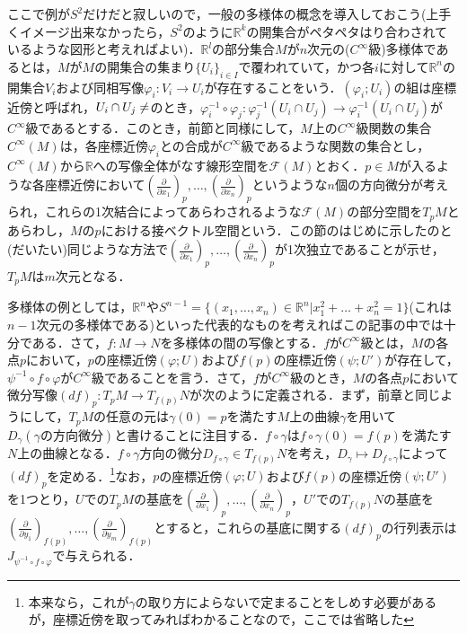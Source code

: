 \documentclass{jsarticle}
\def\realnum{{\mathbb R}}
\def\dfrac{\displaystyle\frac}
\def\delxop{\left(\dfrac{\partial}{\partial x_1}\right)_p}
\def\delxnp{\left(\dfrac{\partial}{\partial x_n}\right)_p}
\def\delyofp{\left(\dfrac{\partial}{\partial y_1}\right)_{f(p)}}
\def\delymfp{\left(\dfrac{\partial}{\partial y_m}\right)_{f(p)}}
\begin{document}
ここで例が$S^2$だけだと寂しいので，一般の多様体の概念を導入しておこう(上手くイメージ出来なかったら，$S^2$のように$\realnum^k$の開集合がペタペタはり合わされているような図形と考えればよい)．$\realnum^l$の部分集合$M$が$n$次元の($C^\infty$級)多様体であるとは，$M$が$M$の開集合の集まり$\{U_i\}_{i\in I}$で覆われていて，かつ各$i$に対して$\realnum^n$の開集合$V_i$および同相写像$\varphi_i:V_i\rightarrow U_i$が存在することをいう．$(\varphi_i;U_i)$の組は座標近傍と呼ばれ，$U_i\cap U_j\neq \empty$のとき，$\varphi_i^{-1}\circ\varphi_j:\varphi_j^{-1}(U_i\cap U_j)\rightarrow\varphi_i^{-1}(U_i\cap U_j)$が$C^{\infty}$級であるとする．このとき，前節と同様にして，$M$上の$C^{\infty}$級関数の集合$C^{\infty}(M)$は，各座標近傍$\varphi_i$との合成が$C^{\infty}$級であるような関数の集合とし，$C^{\infty}(M)$から$\realnum$への写像全体がなす線形空間を${\mathcal F}(M)$とおく．$p\in M$が入るような各座標近傍において$\delxop,\dots,\delxnp$というような$n$個の方向微分が考えられ，これらの1次結合によってあらわされるような${\mathcal F}(M)$の部分空間を$T_pM$とあらわし，$M$の$p$における接ベクトル空間という．この節のはじめに示したのと(だいたい)同じような方法で$\delxop,\dots,\delxnp$が1次独立であることが示せ，$T_pM$は$m$次元となる．

多様体の例としては，$\realnum^n$や$S^{n-1}=\{(x_1,\dots,x_n)\in\realnum^n|x_1^2+\dots+x_n^2=1\}$(これは$n-1$次元の多様体である)といった代表的なものを考えればこの記事の中では十分である．さて，$f:M\rightarrow N$を多様体の間の写像とする．$f$が$C^{\infty}$級とは，$M$の各点$p$において，$p$の座標近傍$(\varphi;U)$および$f(p)$の座標近傍$(\psi;U')$が存在して，$\psi^{-1}\circ f\circ\varphi$が$C^{\infty}$級であることを言う．さて，$f$が$C^{\infty}$級のとき，$M$の各点$p$において微分写像$(df)_p:T_pM\rightarrow T_{f(p)}N$が次のように定義される．まず，前章と同じようにして，$T_pM$の任意の元は$\gamma(0)=p$を満たす$M$上の曲線$\gamma$を用いて$D_\gamma(\gamma の方向微分)$と書けることに注目する．$f\circ\gamma$は$f\circ\gamma(0)=f(p)$を満たす$N$上の曲線となる．$f\circ\gamma$方向の微分$D_{f\circ\gamma}\in T_{f(p)}N$を考え，$D_{\gamma}\mapsto D_{f\circ\gamma}$によって$(df)_p$を定める．\footnote{本来なら，これが$\gamma$の取り方によらないで定まることをしめす必要があるが，座標近傍を取ってみればわかることなので，ここでは省略した}なお，$p$の座標近傍$(\varphi;U)$および$f(p)$の座標近傍$(\psi;U')$を1つとり，$U$での$T_pM$の基底を$\delxop,\dots,\delxnp$，$U'$での$T_{f(p)}N$の基底を$\delyofp,\dots,\delymfp$とすると，これらの基底に関する$(df)_p$の行列表示は$J_{\psi^{-1}\circ f\circ\varphi}$で与えられる．
\end{document}
